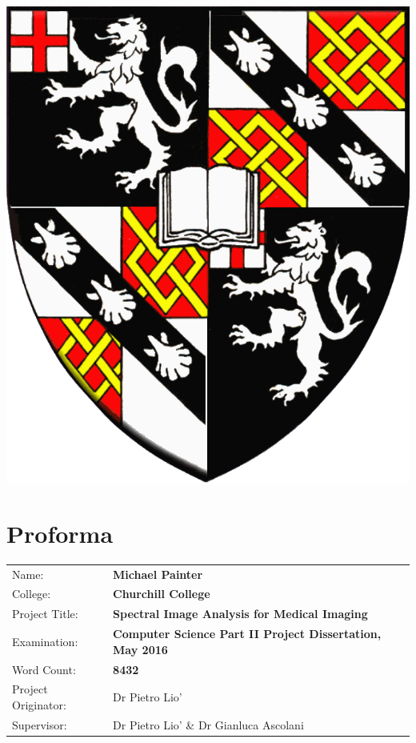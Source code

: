 \documentclass[12pt,twoside,notitlepage]{report}
\begin{document}
\begin{center}
    \includegraphics[scale=0.2792]{titleimg/chucrest}

    \vfill
\end{center}






\cleardoublepage

\setcounter{page}{1}
\pagestyle{plain}

\chapter*{Proforma}

{\large
\begin{tabularx}{\textwidth}{l X}
Name:               & \bf Michael Painter                      \\
College:            & \bf Churchill College                     \\
Project Title:      & \bf Spectral Image Analysis for Medical Imaging \\
Examination:        & \bf Computer Science Part II Project Dissertation, May 2016        \\
Word Count:         & \bf 8432\footnotemark[1]\\
Project Originator: & Dr Pietro Lio'              \\
Supervisor:         & Dr Pietro Lio' \& Dr Gianluca Ascolani       \\ 
\end{tabularx}
}
\end{document}
